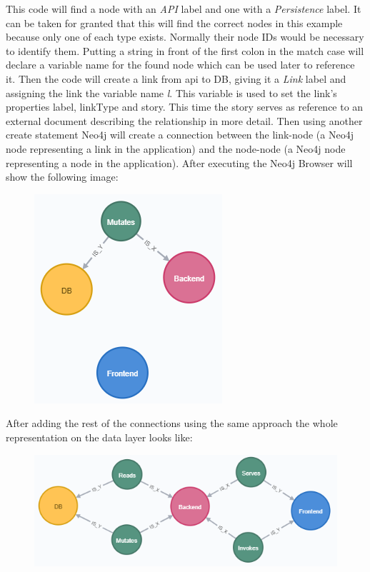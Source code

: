This code will find a node with an \emph{API} label and one with a \emph{Persistence} label. It can be taken for granted that this will find the correct nodes in this example because only one of each type exists. Normally their node IDs would be necessary to identify them. Putting a string in front of the first colon in the match case will declare a variable name for the found node which can be used later to reference it. Then the code will create a link from api to DB, giving it a \emph{Link} label and assigning the link the variable name \emph{l}. This variable is used to set the link's properties label, linkType and story. This time the story serves as reference to an external document describing the relationship in more detail. Then using another create statement Neo4j will create a connection between the link-node (a Neo4j node representing a link in the application) and the node-node (a Neo4j node representing a node in the application). After executing the Neo4j Browser will show the following image:
\begin{figure}[H]
\centering
\includegraphics[scale=1]{Bilder/BasicGraphNeo2.png}
\label{ex423}
\end{figure}

\newpage
After adding the rest of the connections using the same approach the whole representation on the data layer looks like:
\begin{figure}[H]
\centering
\includegraphics[scale=1]{Bilder/BasicGraphNeo3.png}
\label{ex424}
\end{figure}

